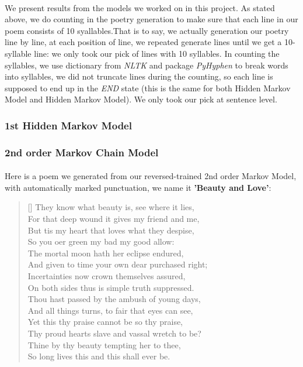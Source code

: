 %
\paragraph{}\label{sec:syllablecount}
We present results from the models we worked on in this project. As stated above, we do counting in the poetry generation to make sure that each line in our poem consists of 10 syallables.That is to say, we actually generation our poetry line by line, at each position of line, we repeated generate lines until we get a 10-syllable line: we only took our pick of lines with 10 syllables. In counting the syllables, we use dictionary from \textit{NLTK} and package \textit{PyHyphen} to break words into syllables, we did not truncate lines during the counting, so each line is supposed to end up in the \textit{END} state (this is the same for both Hidden Markov Model and Hidden Markov Model). We only took our pick at sentence level.
\subsubsection{1st Hidden Markov Model}

\subsubsection{2nd order Markov Chain Model}
\paragraph{}
Here is a poem we generated from our reversed-trained 2nd order Markov Model, with automatically marked punctuation, we name it \textbf{'Beauty and Love'}:
\renewcommand{\poemtoc}{subsection}
\settowidth{\versewidth}{Thy proud hearts slave and vassal wretch to be?}
\begin{verse}[\versewidth]
They know what beauty is, see where it lies,\\
For that deep wound it gives my friend and me,\\
But tis my heart that loves what they despise,\\
So you oer green my bad my good allow:\\
The mortal moon hath her eclipse endured,\\
And given to time your own dear purchased right;\\
Incertainties now crown themselves assured,\\
On both sides thus is simple truth suppressed.\\
Thou hast passed by the ambush of young days,\\
And all things turns, to fair that eyes can see,\\
Yet this thy praise cannot be so thy praise,\\
Thy proud hearts slave and vassal wretch to be?\\
\vin Thine by thy beauty tempting her to thee,\\
\vin  So long lives this and this shall ever be.\\
\end{verse}